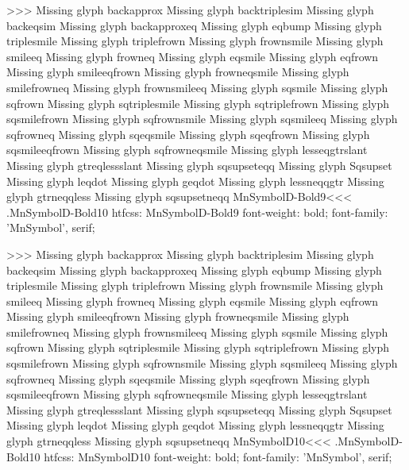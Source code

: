 >>>
Missing glyph	backapprox
Missing glyph	backtriplesim
Missing glyph	backeqsim
Missing glyph	backapproxeq
Missing glyph	eqbump
Missing glyph	triplesmile
Missing glyph	triplefrown
Missing glyph	frownsmile
Missing glyph	smileeq
Missing glyph	frowneq
Missing glyph	eqsmile
Missing glyph	eqfrown
Missing glyph	smileeqfrown
Missing glyph	frowneqsmile
Missing glyph	smilefrowneq
Missing glyph	frownsmileeq
Missing glyph	sqsmile
Missing glyph	sqfrown
Missing glyph	sqtriplesmile
Missing glyph	sqtriplefrown
Missing glyph	sqsmilefrown
Missing glyph	sqfrownsmile
Missing glyph	sqsmileeq
Missing glyph	sqfrowneq
Missing glyph	sqeqsmile
Missing glyph	sqeqfrown
Missing glyph	sqsmileeqfrown
Missing glyph	sqfrowneqsmile
Missing glyph	lesseqgtrslant
Missing glyph	gtreqlessslant
Missing glyph	sqsupseteqq
Missing glyph	Sqsupset
Missing glyph	leqdot
Missing glyph	geqdot
Missing glyph	lessneqqgtr
Missing glyph	gtrneqqless
Missing glyph	sqsupsetneqq
\<MnSymbolD-Bold9\><<<
.MnSymbolD-Bold10
htfcss:  MnSymbolD-Bold9  font-weight: bold; font-family: 'MnSymbol', serif;

>>>
Missing glyph	backapprox
Missing glyph	backtriplesim
Missing glyph	backeqsim
Missing glyph	backapproxeq
Missing glyph	eqbump
Missing glyph	triplesmile
Missing glyph	triplefrown
Missing glyph	frownsmile
Missing glyph	smileeq
Missing glyph	frowneq
Missing glyph	eqsmile
Missing glyph	eqfrown
Missing glyph	smileeqfrown
Missing glyph	frowneqsmile
Missing glyph	smilefrowneq
Missing glyph	frownsmileeq
Missing glyph	sqsmile
Missing glyph	sqfrown
Missing glyph	sqtriplesmile
Missing glyph	sqtriplefrown
Missing glyph	sqsmilefrown
Missing glyph	sqfrownsmile
Missing glyph	sqsmileeq
Missing glyph	sqfrowneq
Missing glyph	sqeqsmile
Missing glyph	sqeqfrown
Missing glyph	sqsmileeqfrown
Missing glyph	sqfrowneqsmile
Missing glyph	lesseqgtrslant
Missing glyph	gtreqlessslant
Missing glyph	sqsupseteqq
Missing glyph	Sqsupset
Missing glyph	leqdot
Missing glyph	geqdot
Missing glyph	lessneqqgtr
Missing glyph	gtrneqqless
Missing glyph	sqsupsetneqq
\<MnSymbolD10\><<<
.MnSymbolD-Bold10
htfcss:  MnSymbolD10  font-weight: bold; font-family: 'MnSymbol', serif;

